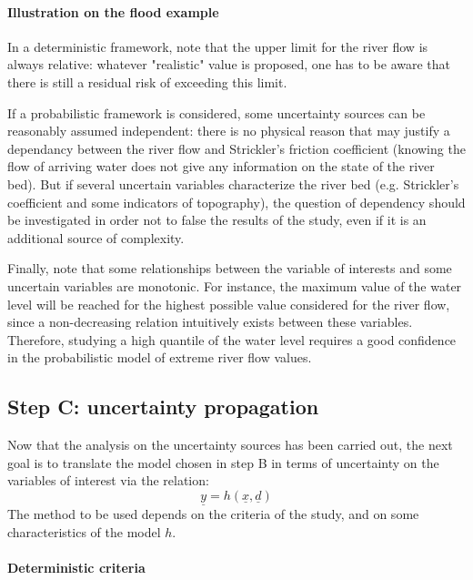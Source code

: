 \paragraph{Illustration on the flood example}
\par

In a deterministic framework, note that the upper limit for the river flow is always relative: whatever "realistic" value is proposed, one has to be aware that there is still a residual risk of exceeding this limit.

If a probabilistic framework is considered, some uncertainty sources can be reasonably assumed independent: there is no physical reason that may justify a dependancy between the river flow and Strickler's friction coefficient  (knowing the flow of arriving water does not give any information on the state of the river bed). But if several uncertain variables characterize the river bed (e.g. Strickler's coefficient and some indicators of topography), the question of dependency should be investigated in order not to false the results of the study, even if it is an additional source of complexity.

Finally, note that some relationships between the variable of interests and some uncertain variables are monotonic. For instance, the maximum value of the water level will be reached for the highest possible value considered for the river flow, since a non-decreasing relation intuitively exists between these variables. Therefore, studying a high quantile of the water level requires a good confidence in the probabilistic model of extreme river flow values.

\subsection{Step C: uncertainty propagation}

Now that the analysis on the uncertainty sources has been carried out, the next goal is to translate the model chosen in step B in terms of uncertainty on the variables of interest via the relation:
$$
\underline{y} = h \left( \underline{x},\underline{d} \right)
$$
The method to be used depends on the criteria of the study, and on some characteristics of the model $h$.

\paragraph{Deterministic criteria}
\par

